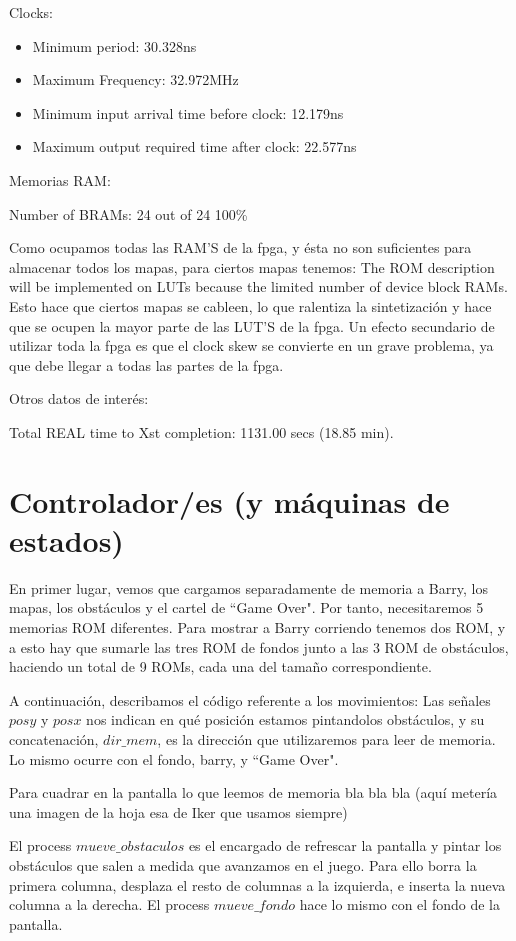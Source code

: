 \documentclass[11pt, a4paper, spanish, openright, twoside]{book}
\begin{document}
	Clocks:
	\begin{itemize}
	\item  Minimum period: 30.328ns 
	\item 	Maximum Frequency: 32.972MHz
 	\item  Minimum input arrival time before clock: 12.179ns
   	\item Maximum output required time after clock: 22.577ns

\end{itemize}
	Memorias RAM:
	
	Number of BRAMs:    24  out of     24   100\%  

	Como ocupamos todas las RAM'S de la fpga, y ésta no son suficientes para almacenar todos los mapas, para ciertos mapas tenemos:
		The ROM description  will be implemented on LUTs because the limited number of device block RAMs.
	Esto hace que ciertos mapas se cableen, lo que ralentiza la sintetización y hace que se ocupen la mayor parte de las LUT'S de la fpga.
	Un efecto secundario de utilizar toda la fpga es que el clock skew se convierte en un grave problema, ya que debe llegar a todas 
	 las partes de la fpga.

	Otros datos de interés:
	
	Total REAL time to Xst completion: 1131.00 secs (18.85 min).

\section{Controlador/es (y máquinas de estados)}
En primer lugar, vemos que cargamos separadamente de memoria a Barry,  los mapas, los obstáculos y el cartel de ``Game Over". Por tanto, necesitaremos 5 memorias ROM diferentes. Para mostrar a Barry corriendo tenemos dos ROM, y a esto hay que sumarle las tres ROM de fondos junto a las 3 ROM de obstáculos, haciendo un total de 9 ROMs, cada una del tamaño correspondiente. 

A continuación, describamos el código referente a los movimientos:
Las señales $posy$ y $posx$ nos indican en qué posición estamos pintandolos obstáculos, y su concatenación, $dir\_mem$, es la dirección que utilizaremos para leer de memoria. Lo mismo ocurre con el fondo, barry, y ``Game Over".

Para cuadrar en la pantalla lo que leemos de memoria bla bla bla (aquí metería una imagen de la hoja esa de Iker que usamos siempre)

El process $mueve\_obstaculos$ es el encargado de refrescar la pantalla y pintar los obstáculos que salen a medida que avanzamos en el juego. Para ello borra la primera columna, desplaza el resto de columnas a la izquierda, e inserta la nueva columna a la derecha. El process $mueve\_fondo$ hace lo mismo con el fondo de la pantalla.
\end{document}
